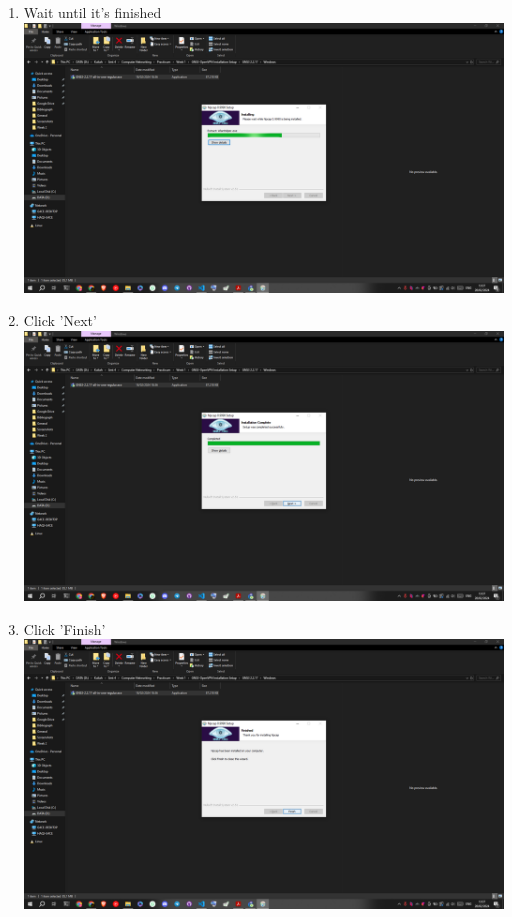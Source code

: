 \documentclass[12pt,titlepage]{article}
\begin{document}
\begin{enumerate}
    \item Wait until it's finished \\ \includegraphics[width=.9\textwidth]{images/figures/Screenshot (435).png}
    \item Click 'Next' \\ \includegraphics[width=.9\textwidth]{images/figures/Screenshot (436).png}
    \newpage
    \item Click 'Finish' \\ \includegraphics[width=.9\textwidth]{images/figures/Screenshot (437).png}

\end{enumerate}
\end{document}
